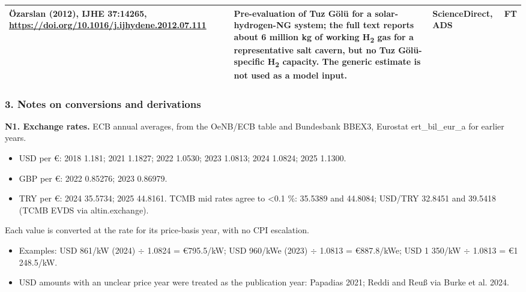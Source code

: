 \documentclass[11pt,a4paper]{article}
\begin{document}
\begin{center}
\begin{tabularx}{\textwidth}{>{\hsize=0.492\hsize\raggedright\arraybackslash}X>{\hsize=1.513\hsize\raggedright\arraybackslash}X>{\hsize=0.996\hsize\raggedright\arraybackslash}Xl}
Özarslan (2012), IJHE 37:14265, \url{https://doi.org/10.1016/j.ijhydene.2012.07.111} & Pre-evaluation of Tuz Gölü for a solar-hydrogen-NG system; the full text reports about 6 million kg of working H\textsubscript{2} gas for a representative salt cavern, but no Tuz Gölü-specific H\textsubscript{2} capacity. The generic estimate is not used as a model input. & ScienceDirect, ADS & FT \\
\bottomrule
\end{tabularx}
\end{center}

\subsubsection{3. Notes on conversions and derivations}

\textbf{N1. Exchange rates.} ECB annual averages, from the OeNB/ECB table and Bundesbank BBEX3, Eurostat ert\_bil\_eur\_a for earlier years.

\begin{itemize}\setlength\itemsep{1pt}

  \item USD per \euro{}: 2018 1.181; 2021 1.1827; 2022 1.0530; 2023 1.0813; 2024 1.0824; 2025 1.1300.

  \item GBP per \euro{}: 2022 0.85276; 2023 0.86979.

  \item TRY per \euro{}: 2024 35.5734; 2025 44.8161. TCMB mid rates agree to <0.1 \%: 35.5389 and 44.8084; USD/TRY 32.8451 and 39.5418 (TCMB EVDS via altin.exchange).

\end{itemize}

Each value is converted at the rate for its price-basis year, with no CPI escalation.

\begin{itemize}\setlength\itemsep{1pt}

  \item Examples: USD 861/kW (2024) $\div$ 1.0824 = \euro{}795.5/kW; USD 960/kWe (2023) $\div$ 1.0813 = \euro{}887.8/kWe; USD 1 350/kW $\div$ 1.0813 = \euro{}1 248.5/kW.

  \item USD amounts with an unclear price year were treated as the publication year: Papadias 2021; Reddi and Reuß via Burke et al. 2024.

\end{itemize}
\end{document}
